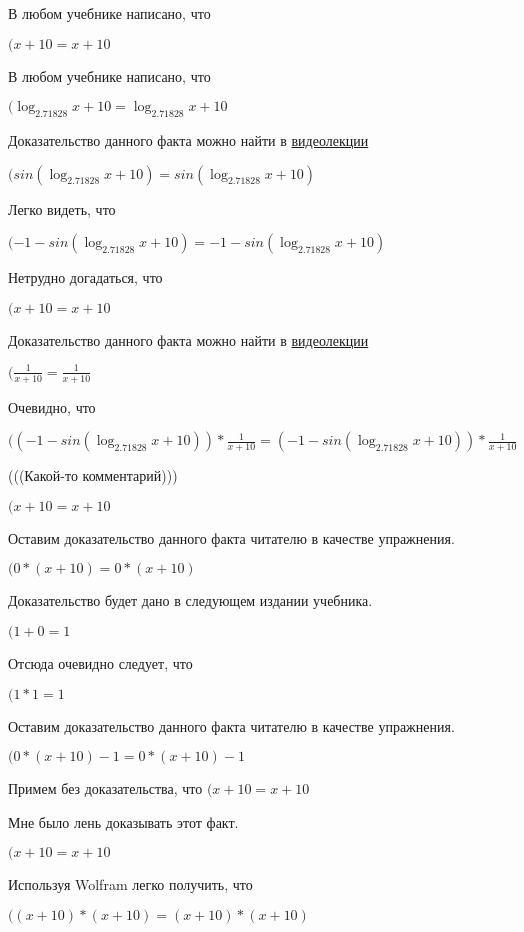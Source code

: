 \documentclass[12pt,a4paper,fleqn]{article}
\theoremstyle{definition}
\begin{document}
В любом учебнике написано, что

$( x  +  10  =  x  +  10 $

В любом учебнике написано, что

$(\log_{ 2.71828 }{ x  +  10 } = \log_{ 2.71828 }{ x  +  10 }$

Доказательство данного факта можно найти в \href{https://www.youtube.com/watch?v=dQw4w9WgXcQ}{видеолекции}

$(sin(\log_{ 2.71828 }{ x  +  10 }) = sin(\log_{ 2.71828 }{ x  +  10 })$

Легко видеть, что

$( -1  - sin(\log_{ 2.71828 }{ x  +  10 }) =  -1  - sin(\log_{ 2.71828 }{ x  +  10 })$

Нетрудно догадаться, что

$( x  +  10  =  x  +  10 $

Доказательство данного факта можно найти в \href{https://www.youtube.com/watch?v=dQw4w9WgXcQ}{видеолекции}

$(\frac{ 1 }{ x  +  10 }
 = \frac{ 1 }{ x  +  10 }
$

Очевидно, что

$(( -1  - sin(\log_{ 2.71828 }{ x  +  10 })) * \frac{ 1 }{ x  +  10 }
 = ( -1  - sin(\log_{ 2.71828 }{ x  +  10 })) * \frac{ 1 }{ x  +  10 }
$

(((Какой-то комментарий)))

$( x  +  10  =  x  +  10 $

Оставим доказательство данного факта читателю в качестве упражнения.

$( 0  * ( x  +  10 ) =  0  * ( x  +  10 )$

Доказательство будет дано в следующем издании учебника.

$( 1  +  0  =  1 $

Отсюда очевидно следует, что

$( 1  *  1  =  1 $

Оставим доказательство данного факта читателю в качестве упражнения.

$( 0  * ( x  +  10 ) -  1  =  0  * ( x  +  10 ) -  1 $

Примем без доказательства, что
$( x  +  10  =  x  +  10 $

Мне было лень доказывать этот факт.

$( x  +  10  =  x  +  10 $

Используя Wolfram легко получить, что

$(( x  +  10 ) * ( x  +  10 ) = ( x  +  10 ) * ( x  +  10 )$
\end{document}
